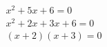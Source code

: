 \[ \begin{array} { l } x ^ { 2 } + 5 x + 6 = 0 \\ x ^ { 2 } + 2 x + 3 x + 6 = 0 \\ ( x + 2 ) ( x + 3 ) = 0 \end{array} \]